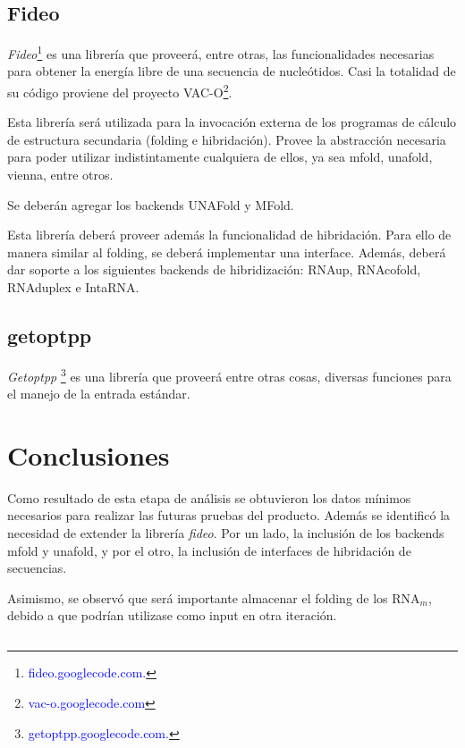\documentclass[12pt,a4paper,spanish]{article}
\begin{document}
	\subsection{Fideo}
			\textit{Fideo}\footnote{\textcolor{blue}{fideo.googlecode.com.}} es una librería que proveerá, entre otras, 			las funcionalidades necesarias para obtener la energía libre de una secuencia de nucleótidos. Casi la 				totalidad de su código proviene del proyecto VAC-O\footnote{\textcolor{blue}{vac-o.googlecode.com}}.
			\par Esta librería será utilizada para la invocación externa de los programas de cálculo de estructura 				secundaria (folding e hibridación). Provee la abstracción necesaria para poder utilizar indistintamente 			cualquiera de ellos, ya sea mfold, unafold, vienna, entre otros.	 
\par Se deberán agregar los backends \textsf{UNAFold} y \textsf{MFold}. 
\par Esta librería deberá proveer además la funcionalidad de hibridación. Para ello de manera similar al folding, se deberá implementar una interface. Además, deberá dar soporte a los siguientes backends de hibridización: \textsf{RNAup}, \textsf{RNAcofold}, \textsf{RNAduplex} e \textsf{IntaRNA}.

    \subsection{getoptpp}
        \textit{Getoptpp} \footnote{\textcolor{blue}{getoptpp.googlecode.com.}} es una librería que proveerá
         entre otras cosas, diversas funciones para el manejo de la entrada estándar.
        
\section{Conclusiones}
	Como resultado de esta etapa de análisis se obtuvieron los datos mínimos necesarios para realizar las futuras pruebas 		del producto. Además se identificó la necesidad de extender la librería \emph{fideo}. Por un lado, la inclusión de los 		backends \textsf{mfold}\cite{8}\cite{9} y \textsf{unafold}\cite{10}, y por el otro, la inclusión de interfaces de 		hibridación de secuencias.
	\par Asimismo, se observó que será importante almacenar el folding de los RNA$_m$, debido a que podrían utilizase como 		input en otra iteración.

    \subsection{}
\end{document}
